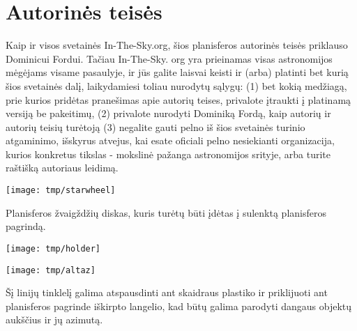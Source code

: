 \documentclass[a4paper,onecolumn,10pt]{article}
\begin{document}
\section*{Autorinės teisės}

Kaip ir visos svetainės In-The-Sky.org, šios planisferos autorinės teisės priklauso Dominicui Fordui. Tačiau In-The-Sky. org yra prieinamas visas astronomijos mėgėjams visame pasaulyje, ir jūs galite laisvai keisti ir (arba) platinti bet kurią šios svetainės dalį, laikydamiesi toliau nurodytų sąlygų: (1) bet kokią medžiagą, prie kurios pridėtas pranešimas apie autorių teises, privalote įtraukti į platinamą versiją be pakeitimų, (2) privalote nurodyti Dominiką Fordą, kaip autorių ir autorių teisių turėtoją (3) negalite gauti pelno iš šios svetainės turinio atgaminimo, išskyrus atvejus, kai esate oficiali pelno nesiekianti organizacija, kurios konkretus tikslas - mokslinė pažanga astronomijos srityje, arba turite raštišką autoriaus leidimą.

\newpage

\centerline{\texttt{[image: tmp/starwheel]}}

\vspace{1cm}
Planisferos žvaigždžių diskas, kuris turėtų būti įdėtas į sulenktą planisferos pagrindą.

\newpage
\thispagestyle{empty}
\vspace*{-3.0cm}
\centerline{\texttt{[image: tmp/holder]}}
\newpage

\centerline{\texttt{[image: tmp/altaz]}}

\vspace{1cm}
Šį linijų tinklelį galima atspausdinti ant skaidraus plastiko ir priklijuoti ant planisferos pagrinde iškirpto langelio, kad būtų galima parodyti dangaus objektų aukščius ir jų azimutą.
\end{document}

